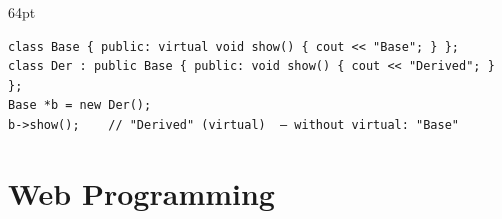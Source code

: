 \endgroup

\begin{listingblock}{64pt}
\begin{Verbatim}[fontsize=\fontsize{9.0}{10.9}\selectfont]
class Base { public: virtual void show() { cout << "Base"; } };
class Der : public Base { public: void show() { cout << "Derived"; } };
Base *b = new Der();
b->show();    // "Derived" (virtual)  — without virtual: "Base"
\end{Verbatim}
\end{listingblock}

\needspace{130pt}

\hypertarget{p2-03--5-web-programming}{%
\section{Web Programming}\label{p2-03--5-web-programming}}

\begingroup\small

